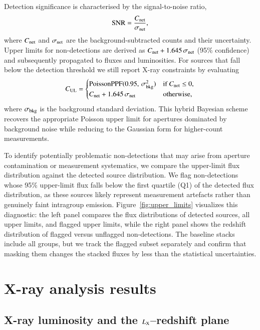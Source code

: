 \documentclass{aa}
\begin{document}
Detection significance is characterised by the signal-to-noise ratio,
\begin{equation}
\mathrm{SNR} = \frac{C_{\rm net}}{\sigma_{\rm net}},
\label{eq:SNR}
\end{equation}
where $C_{\rm net}$ and $\sigma_{\rm net}$ are the background-subtracted counts and their uncertainty. Upper limits for non-detections are derived as $C_{\rm net} + 1.645\,\sigma_{\rm net}$ (95\% confidence) and subsequently propagated to fluxes and luminosities. For sources that fall below the detection threshold we still report X-ray constraints by evaluating
\begin{equation}
C_{\rm UL} = \begin{cases}
\mathrm{PoissonPPF}(0.95,\,\sigma_{\rm bkg}^2) & \text{if } C_{\rm net} \leq 0, \\
C_{\rm net} + 1.645\,\sigma_{\rm net} & \text{otherwise},
\end{cases}
\label{eq:UL}
\end{equation}
where $\sigma_{\rm bkg}$ is the background standard deviation. This hybrid Bayesian scheme recovers the appropriate Poisson upper limit for apertures dominated by background noise while reducing to the Gaussian form for higher-count measurements.

To identify potentially problematic non-detections that may arise from aperture contamination or measurement systematics, we compare the upper-limit flux distribution against the detected source distribution. We flag non-detections whose 95\% upper-limit flux falls below the first quartile (Q1) of the detected flux distribution, as these sources likely represent measurement artefacts rather than genuinely faint intragroup emission. Figure~\ref{fig:upper_limits} visualizes this diagnostic: the left panel compares the flux distributions of detected sources, all upper limits, and flagged upper limits, while the right panel shows the redshift distribution of flagged versus unflagged non-detections. The baseline stacks include all groups, but we track the flagged subset separately and confirm that masking them changes the stacked fluxes by less than the statistical uncertainties.

\section{X-ray analysis results}

\subsection{X-ray luminosity and the $L_{\rm X}$--redshift plane}
\label{sec:LX_z}
\end{document}
